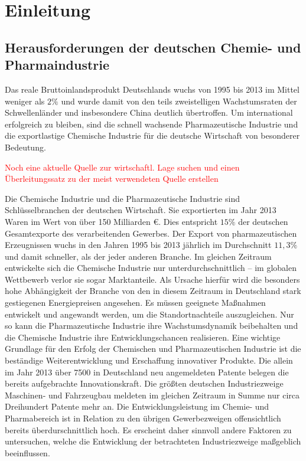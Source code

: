 \chapter{Einleitung}\label{ch:einleitung}
\section{Herausforderungen der deutschen Chemie- und Pharmaindustrie}\label{sec:einltg_chemPharmaIndustrie}
Das reale Bruttoinlandsprodukt Deutschlands wuchs von 1995 bis 2013 im Mittel weniger als $2\%$ und wurde damit von den teils zweistelligen Wachstumsraten der Schwellenl\"ander und insbesondere China deutlich \"ubertroffen. Um international erfolgreich zu bleiben, sind die schnell wachsende Pharmazeutische Industrie und die exportlastige Chemische Industrie f\"ur die deutsche Wirtschaft von besonderer Bedeutung. 

\textcolor{red}{Noch eine aktuelle Quelle zur wirtschaftl. Lage suchen und einen \"Uberleitungssatz zu der meist verwendeten Quelle \cite{PerspektiveD_2016} erstellen}

Die Chemische Industrie und die Pharmazeutische Industrie sind Schl\"usselbranchen der deutschen Wirtschaft. Sie exportierten im Jahr 2013 Waren im Wert von \"uber 150 Milliarden \euro. Dies entspricht $15 \%$ der deutschen Gesamtexporte des verarbeitenden Gewerbes. Der Export von pharmazeutischen Erzeugnissen wuchs in den Jahren 1995 bis 2013 j\"ahrlich im Durchschnitt $11,3 \%$ und damit schneller, als der jeder anderen Branche. Im gleichen Zeitraum entwickelte sich die Chemische Industrie nur unterdurchschnittlich -- im globalen Wettbewerb verlor sie sogar Marktanteile. Als Ursache hierf\"ur wird die besonders hohe Abh\"angigkeit der Branche von den in diesem Zeitraum in Deutschland stark gestiegenen Energiepreisen angesehen. Es m\"ussen geeignete Ma\ss{}nahmen entwickelt und angewandt werden, um die Standortnachteile auszugleichen. Nur so kann die Pharmazeutische Industrie ihre Wachstumsdynamik beibehalten und die Chemische Industrie ihre Entwicklungschancen realisieren. \newline
Eine wichtige Grundlage f\"ur den Erfolg der Chemischen und Pharmazeutischen Industrie ist die best\"andige Weiterentwicklung und Erschaffung innovativer Produkte. Die allein im Jahr 2013 \"uber 7500 in Deutschland neu angemeldeten Patente belegen die bereits aufgebrachte Innovationskraft. Die gr\"o\ss{}ten deutschen Industriezweige Maschinen- und Fahrzeugbau meldeten im gleichen Zeitraum in Summe nur circa Dreihundert Patente mehr an. Die Entwicklungsleistung im Chemie- und Pharmabereich ist in Relation zu den \"ubrigen Gewerbezweigen offensichtlich bereits \"uberdurschnittlich hoch. Es erscheint daher sinnvoll andere Faktoren zu untersuchen, welche die Entwicklung der betrachteten Industriezweige ma\ss{}geblich beeinflussen. \cite{PerspektiveD_2016}

